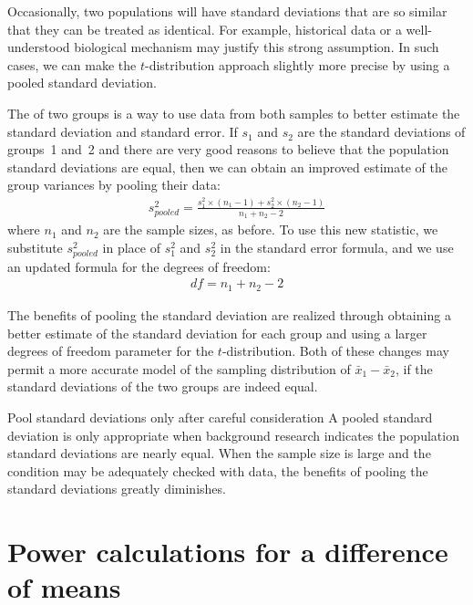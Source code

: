 Occasionally, two populations will have standard deviations
that are so similar that they can be treated as identical.
For example, historical data or a well-understood biological
mechanism may justify this strong assumption.
In such cases, we can make the $t$-distribution approach
slightly more precise by using a pooled standard deviation.

The  of two groups is a way
to use data from both samples to better estimate the standard
deviation and standard error.
If $s_1^{}$ and $s_2^{}$ are the standard deviations
of groups~1 and~2 and there are very good reasons to believe
that the population standard deviations are equal,
then we can obtain an improved estimate of the group variances
by pooling their data:
\begin{align*}
s_{pooled}^2 = \frac{s_1^2\times (n_1-1) + s_2^2\times (n_2-1)}{n_1 + n_2 - 2}
\end{align*}
where $n_1$ and $n_2$ are the sample sizes, as before.
To use this new statistic, we substitute $s_{pooled}^2$
in place of $s_1^2$ and $s_2^2$ in the standard error formula,
and we use an updated formula for the degrees of freedom:
\begin{align*}
df = n_1 + n_2 - 2
\end{align*}

The benefits of pooling the standard deviation are realized
through obtaining a better estimate of the standard deviation
for each group and using a larger degrees of freedom parameter
for the $t$-distribution.
Both of these changes may permit a more accurate model of the
sampling distribution of $\bar{x}_1 - \bar{x}_2$,
if the standard deviations of the two groups are indeed equal.

\begin{onebox}
    {Pool standard deviations only after careful consideration}
  A pooled standard deviation is only appropriate when
  background research indicates the population standard
  deviations are nearly equal.
  When the sample size is large and the condition
  may be adequately checked with data, the benefits
  of pooling the standard deviations greatly diminishes.
\end{onebox}


{}







\section{Power calculations for a difference of means}
\label{PowerForDifferenceOfTwoMeans}

